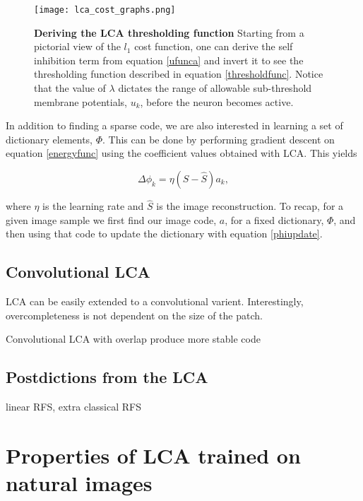 \begin{figure}[ht]\label{lca_thresh}
\centering %
\texttt{[image: lca\_cost\_graphs.png]}
\caption{\textbf{Deriving the LCA thresholding function} Starting from a pictorial view of the $l_{1}$ cost function, one can derive the self inhibition term from equation \eqref{ufunca} and invert it to see the thresholding function described in equation \eqref{thresholdfunc}. Notice that the value of $\lambda$ dictates the range of allowable sub-threshold membrane potentials, $u_{k}$, before the neuron becomes active.}
\end{figure}

In addition to finding a sparse code, we are also interested in learning a set of dictionary elements, $\Phi$. This can be done by performing gradient descent on equation \eqref{energyfunc} using the coefficient values obtained with LCA. This yields

\begin{equation}
  \Delta \phi_{k} = \eta (S - \hat{S}) a_{k},
\label{phiupdate}
\end{equation}

\noindent where $\eta$ is the learning rate and $\hat{S}$ is the image reconstruction. To recap, for a given image sample we first find our image code, $a$, for a fixed dictionary, $\Phi$, and then using that code to update the dictionary with equation \eqref{phiupdate}.


\subsection{Convolutional LCA}
LCA can be easily extended to a convolutional varient. Interestingly, overcompleteness is not dependent on the size of the patch.

Convolutional LCA with overlap produce more stable code %


\subsection{Postdictions from the LCA}
linear RFS, extra classical RFS


\section{Properties of LCA trained on natural images}



